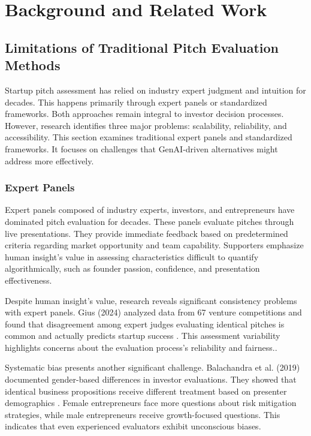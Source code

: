 \chapter{Background and Related Work}
\label{ch:soa}

\section{Limitations of Traditional Pitch Evaluation Methods}
\label{sec:traditional-methods}

Startup pitch assessment has relied on industry expert judgment and intuition for decades. This happens primarily through expert panels or standardized frameworks. Both approaches remain integral to investor decision processes. However, research identifies three major problems: scalability, reliability, and accessibility. This section examines traditional expert panels and standardized frameworks. It focuses on challenges that GenAI-driven alternatives might address more effectively.

\subsection{Expert Panels}\label{subsec:expert-panels}
Expert panels composed of industry experts, investors, and entrepreneurs have dominated pitch evaluation for decades. These panels evaluate pitches through live presentations. They provide immediate feedback based on predetermined criteria regarding market opportunity and team capability. Supporters emphasize human insight's value in assessing characteristics difficult to quantify algorithmically, such as founder passion, confidence, and presentation effectiveness.

Despite human insight's value, research reveals significant consistency problems with expert panels. Gius (2024) analyzed data from 67 venture competitions and found that disagreement among expert judges evaluating identical pitches is common and actually predicts startup success \cite{Gius2024}. This assessment variability highlights concerns about the evaluation process's reliability and fairness..

Systematic bias presents another significant challenge. Balachandra et al. (2019) documented gender-based differences in investor evaluations. They showed that identical business propositions receive different treatment based on presenter demographics \cite{Balachandra2019}. Female entrepreneurs face more questions about risk mitigation strategies, while male entrepreneurs receive growth-focused questions. This indicates that even experienced evaluators exhibit unconscious biases.

